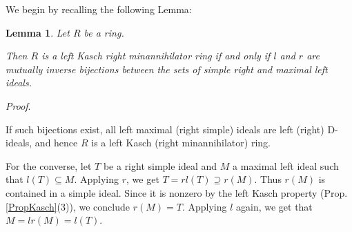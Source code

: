 \documentclass[11pt]{article}
\theoremstyle{plain}
\newtheorem{Lemma}[veta]{Lemma}
\theoremstyle{remark}
\theoremstyle{plain}
\newenvironment{Proof}{
  \par\medskip\noindent
  \textit{Proof}.
}{
\newline
\rightline{$\qedsymbol$}
}
\begin{document}
We begin by recalling the following Lemma:
\begin{Lemma}\label{LemmaBijectionSimple}
    Let $R$ be a ring.
    
      Then $R$ is a left Kasch right minannihilator ring if and only if $l$ and $r$ are mutually inverse bijections between the sets of simple right and maximal left ideals.
\end{Lemma}
\begin{Proof}
If such bijections exist, all left maximal (right simple) ideals are left (right) D-ideals, and hence $R$ is a left Kasch (right minannihilator) ring.

For the converse,  let $T$ be a right simple ideal and $M$ a maximal left ideal such that $l(T)\subseteq M$. Applying $r$, we get $T=rl(T)\supseteq r(M)$. Thus $r(M)$ is contained in a simple ideal. Since it is nonzero by the left Kasch property (Prop. \ref{PropKasch}(3)), we conclude $r(M)=T$. Applying $l$ again, we get that $M=lr(M)=l(T)$.
\end{Proof}
\end{document}
